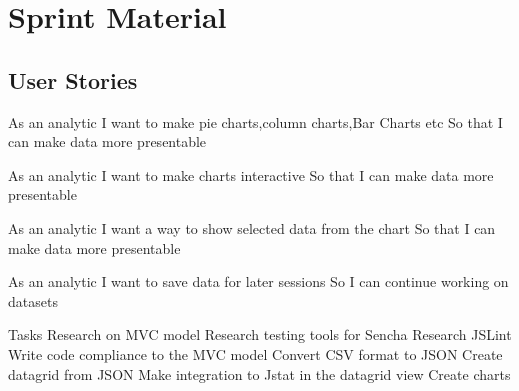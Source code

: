 \section{Sprint Material} %
\label{sec:Sprint Material}
\subsection{User Stories} 
As an analytic
I want to make pie charts,column charts,Bar Charts etc
So that I can make data more presentable

As an analytic
I want to make charts interactive 
So that I can make data more presentable

As an analytic
I want a way to show selected data from the chart
So that I can make data more presentable

As an analytic
I want to save data for later sessions
So I can continue working on datasets


Tasks
Research on MVC model
Research testing tools for Sencha
Research JSLint
Write code compliance  to the MVC model
Convert CSV format to JSON
Create datagrid from JSON
Make integration to Jstat in the datagrid view
Create charts